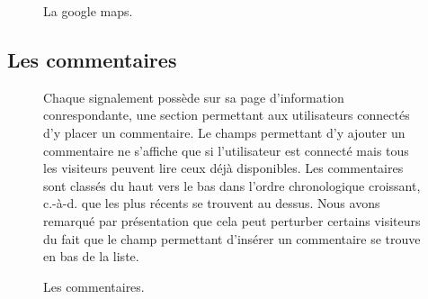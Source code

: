 \documentclass[a4paper,11pt]{article}
\begin{document}
\begin{figure}[h!]
	\centering
	\caption{La google maps.}
\end{figure}

\subsection{Les commentaires}

\begin{figure}[H]
	\begin{minipage}{0.4\linewidth}   
    	\centering
		\caption{Les commentaires.}
   	\end{minipage}
   	\begin{minipage}{0.6\linewidth}
\parindent 5mm Chaque signalement possède sur sa page d'information conrespondante, une section permettant aux utilisateurs connectés d'y placer un commentaire. Le champs permettant d'y ajouter un commentaire ne s'affiche que si l'utilisateur est connecté mais tous les visiteurs peuvent lire ceux déjà disponibles. Les commentaires sont classés du haut vers le bas dans l'ordre chronologique croissant, c.-à-d. que les plus récents se trouvent au dessus. Nous avons remarqué par présentation que cela peut perturber certains visiteurs du fait que le champ permettant d'insérer un commentaire se trouve en bas de la liste.
   	\end{minipage}
\end{figure}
\end{document}
